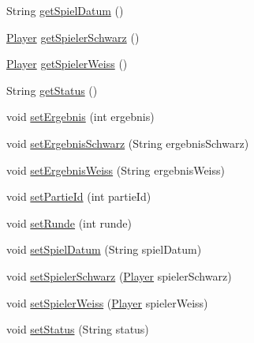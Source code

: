 \begin{DoxyCompactItemize}
\item 
String \hyperlink{classde_1_1turnierverwaltung_1_1model_1_1_game_ad85dc1f437417bd2950a34ea9eda36a1}{get\+Spiel\+Datum} ()
\item 
\hyperlink{classde_1_1turnierverwaltung_1_1model_1_1_player}{Player} \hyperlink{classde_1_1turnierverwaltung_1_1model_1_1_game_a88f23d69968d727dbed7d796bf802c90}{get\+Spieler\+Schwarz} ()
\item 
\hyperlink{classde_1_1turnierverwaltung_1_1model_1_1_player}{Player} \hyperlink{classde_1_1turnierverwaltung_1_1model_1_1_game_aedd63423ffd7ce0785ea6b6f0272ff2f}{get\+Spieler\+Weiss} ()
\item 
String \hyperlink{classde_1_1turnierverwaltung_1_1model_1_1_game_a2ee025a8368264a5dff8a5898d163201}{get\+Status} ()
\item 
void \hyperlink{classde_1_1turnierverwaltung_1_1model_1_1_game_abaa94da465cfe9669ec0bcaa076054fe}{set\+Ergebnis} (int ergebnis)
\item 
void \hyperlink{classde_1_1turnierverwaltung_1_1model_1_1_game_af6896b63f6b1de28be8bdae862397ce1}{set\+Ergebnis\+Schwarz} (String ergebnis\+Schwarz)
\item 
void \hyperlink{classde_1_1turnierverwaltung_1_1model_1_1_game_a36d8d95c48616976730e7d7ed116b3a9}{set\+Ergebnis\+Weiss} (String ergebnis\+Weiss)
\item 
void \hyperlink{classde_1_1turnierverwaltung_1_1model_1_1_game_a68a336005b1f9618a2e1bf83b34a2041}{set\+Partie\+Id} (int partie\+Id)
\item 
void \hyperlink{classde_1_1turnierverwaltung_1_1model_1_1_game_a7e3d7bb3b248b0c806b30ee23c710389}{set\+Runde} (int runde)
\item 
void \hyperlink{classde_1_1turnierverwaltung_1_1model_1_1_game_a2a337bdafe97013dcc2b6e8174642d88}{set\+Spiel\+Datum} (String spiel\+Datum)
\item 
void \hyperlink{classde_1_1turnierverwaltung_1_1model_1_1_game_a7518951d7369b91c482baf7af1432868}{set\+Spieler\+Schwarz} (\hyperlink{classde_1_1turnierverwaltung_1_1model_1_1_player}{Player} spieler\+Schwarz)
\item 
void \hyperlink{classde_1_1turnierverwaltung_1_1model_1_1_game_a5b6baedf2e82548de9396246369cf039}{set\+Spieler\+Weiss} (\hyperlink{classde_1_1turnierverwaltung_1_1model_1_1_player}{Player} spieler\+Weiss)
\item 
void \hyperlink{classde_1_1turnierverwaltung_1_1model_1_1_game_a0eea72aa11e2381682af6467f93a69d4}{set\+Status} (String status)
\end{DoxyCompactItemize}


